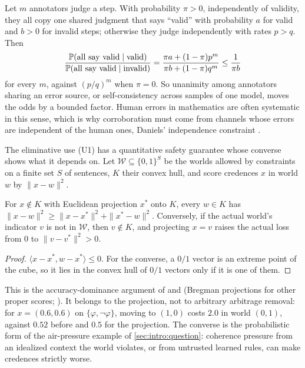 \begin{remark}\label{rem:coherence:consensus}
Let $m$ annotators judge a step. With probability $\pi>0$, independently of validity, they all copy one shared judgment that says ``valid'' with probability $a$ for valid and $b>0$ for invalid steps; otherwise they judge independently with rates $p>q$. Then
\[
\frac{\mathbb{P}(\text{all say valid}\mid\text{valid})}{\mathbb{P}(\text{all say valid}\mid\text{invalid})}=\frac{\pi a+(1-\pi)p^m}{\pi b+(1-\pi)q^m}\le\frac1{\pi b}
\]
for every $m$, against $(p/q)^m$ when $\pi=0$. So unanimity among annotators sharing an error source, or self-consistency across samples of one model, moves the odds by a bounded factor. Human errors in mathematics are often systematic in this sense, which is why corroboration must come from channels whose errors are independent of the human ones, Daniels' independence constraint \citep{daniels1979wide}.
\end{remark}

The eliminative use (U1) has a quantitative safety guarantee whose converse shows what it depends on. Let $\mathcal W\subseteq\{0,1\}^S$ be the worlds allowed by constraints on a finite set $S$ of sentences, $K$ their convex hull, and score credences $x$ in world $w$ by $\|x-w\|^2$.

\begin{lemma}\label{lem:coherence:projection}
For $x\notin K$ with Euclidean projection $x^*$ onto $K$, every $w\in K$ has $\|x-w\|^2\ge\|x-x^*\|^2+\|x^*-w\|^2$. Conversely, if the actual world's indicator $v$ is not in $\mathcal W$, then $v\notin K$, and projecting $x=v$ raises the actual loss from $0$ to $\|v-v^*\|^2>0$.
\end{lemma}

\begin{proof}
$\langle x-x^*,w-x^*\rangle\le0$. For the converse, a $0/1$ vector is an extreme point of the cube, so it lies in the convex hull of $0/1$ vectors only if it is one of them.
\end{proof}

This is the accuracy-dominance argument of \citet{definetti1974theory} and \citet{joyce1998nonpragmatic} (Bregman projections for other proper scores; \citealt{predd2009probabilistic}). It belongs to the projection, not to arbitrary arbitrage removal: for $x=(0.6,0.6)$ on $\{\varphi,\neg\varphi\}$, moving to $(1,0)$ costs $2.0$ in world $(0,1)$, against $0.52$ before and $0.5$ for the projection. The converse is the probabilistic form of the air-pressure example of \cref{sec:intro:question}: coherence pressure from an idealized context the world violates, or from untrusted learned rules, can make credences strictly worse.
